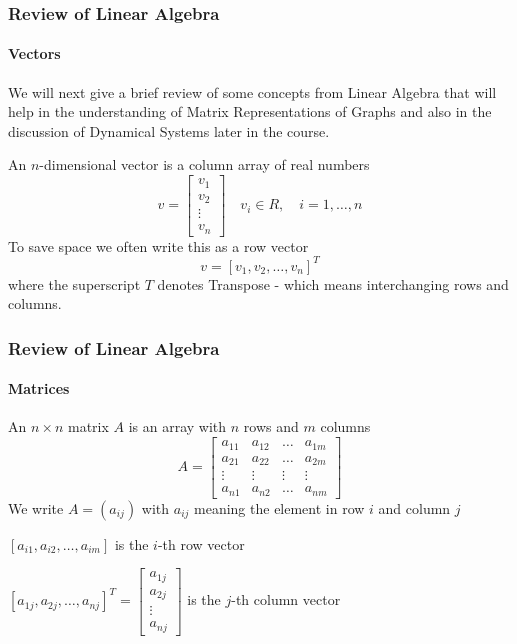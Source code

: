 \begin{frame}
\frametitle{Review of Linear Algebra}
\framesubtitle{Vectors}

We will next give a brief review of some concepts from {\bor Linear Algebra}
that will help in the understanding of {\bor Matrix Representations of Graphs}
and also in the discussion of {\bor Dynamical Systems} later in the course.

\begin{definition}
An {$n$-dimensional vector} is a column array of real numbers
$$
v = \left[ \begin{array}{c} v_1 \\ v_2 \\ \vdots \\ v_n \end{array}\right] \quad v_i\in R, \quad i=1,\dots,n
$$
To save space we often write this as a row vector
$$
v = [ v_1, v_2, \dots, v_n]^T
$$
where the superscript $T$ denotes {\bor Transpose} - which means interchanging rows and columns.
\end{definition}
\end{frame}
\begin{frame}
\frametitle{Review of Linear Algebra}
\framesubtitle{Matrices}
\begin{definition}
An {\bor $n\times n$ matrix} $A$ is an array with {\bor $n$ rows} and {\bor $m$ columns}
$$
A = \left[\begin{array}{cccc}
a_{11} & a_{12} & \dots & a_{1m} \\
a_{21} & a_{22} & \dots & a_{2m} \\
\vdots & \vdots & \vdots & \vdots \\
a_{n1} & a_{n2} & \dots & a_{nm}
\end{array}\right]
$$
We write $A = (a_{ij})$ with $a_{ij}$ meaning the element in {\bor row $i$} and {\bor column $j$}

{\bor $[a_{i1}, a_{i2},\dots,a_{im}]$ is the $i$-th row vector}

{\bor $[a_{1j}, a_{2j},\dots,a_{nj}]^T = \left[\begin{array}{c} a_{1j} \\ a_{2j} \\ \vdots \\ a_{nj} \end{array}\right]$ is the $j$-th column vector}
\end{definition}
\end{frame}
